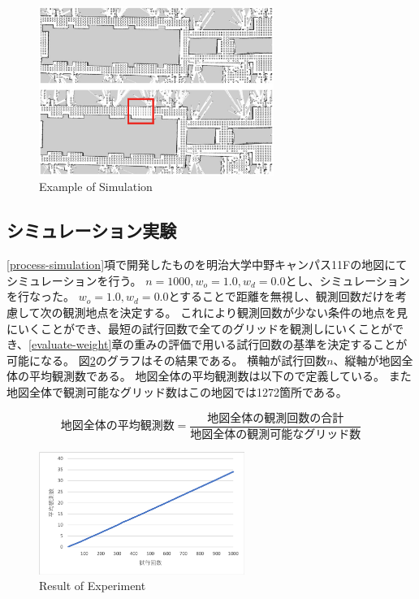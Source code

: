 \documentclass{jsarticle}
\begin{document}
\begin{figure}[tbh]
 \centering
  \includegraphics[height=55mm]{fig/example.eps}
  \vspace*{-4mm}
  \caption{Example of Simulation}
  \label{fig: example of simulation}
\end{figure}

\subsection{シミュレーション実験}
\label{run-simulation}
\ref{process-simulation}項で開発したものを明治大学中野キャンパス11Fの地図にてシミュレーションを行う。
$n=1000,w_o=1.0,w_d=0.0$とし、シミュレーションを行なった。
$w_o=1.0,w_d=0.0$とすることで距離を無視し、観測回数だけを考慮して次の観測地点を決定する。
これにより観測回数が少ない条件の地点を見にいくことができ、最短の試行回数で全てのグリッドを観測しにいくことができ、\ref{evaluate-weight}章の重みの評価で用いる試行回数の基準を決定することが可能になる。
図\ref{fig: result of experiments}のグラフはその結果である。
横軸が試行回数$n$、縦軸が地図全体の平均観測数である。
地図全体の平均観測数は以下ので定義している。
また地図全体で観測可能なグリッド数はこの地図では1272箇所である。

\begin{equation}
  地図全体の平均観測数 = \frac{地図全体の観測回数の合計}{地図全体の観測可能なグリッド数}
	\label{eqn: average-in-map}
\end{equation}

\begin{figure}[tbh]
 \centering
  \includegraphics[height=40mm]{fig/n1000.eps}
  \vspace*{-4mm}
  \caption{Result of Experiment}
  \label{fig: result of experiments}
\end{figure}
\end{document}
